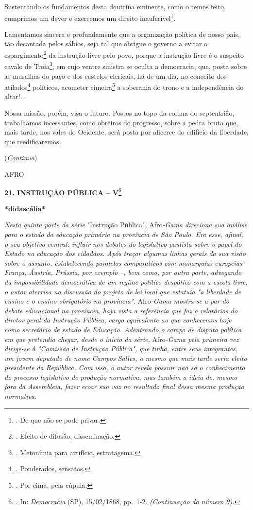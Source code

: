Sustentando os fundamentos desta doutrina eminente, como o temos feito,
cumprimos um dever e exercemos um direito inauferível\footnote{. De que
  não se pode privar.}.

Lamentamos sincera e profundamente que a organização política de nosso
país, tão decantada pelos sábios, seja tal que obrigue o governo a
evitar o espargimento\footnote{. Efeito de difusão, disseminação.} da
instrução livre pelo povo, porque a instrução livre é o suspeito cavalo
de Troia\footnote{. Metonímia para artifício, estratagema.}, em cujo
ventre sinistra se oculta a democracia, que, posta sobre as muralhas do
paço e dos castelos clericais, há de um dia, no conceito dos
atilados\footnote{. Ponderados, sensatos.} políticos, acometer
cimeira\footnote{. Por cima, pela cúpula.} a soberania do trono e a
independência do altar!...

Nossa missão, porém, visa o futuro. Postos no topo da coluna do
septentrião, trabalhamos incessantes, como obreiros do progresso, sobre
a pedra bruta que, mais tarde, nos vales do Ocidente, será posta por
alicerce do edifício da liberdade, que reedificaremos.

(\emph{Continua})

AFRO

\textbf{21. INSTRUÇÃO PÚBLICA -- V}\footnote{. In: \emph{Democracia}
  (SP), 15/02/1868, pp.~1-2. \emph{(Continuação do número 9).}}

\textbf{*didascália*}

\emph{Nesta quinta parte da série} "Instrução Pública"\emph{,}
Afro\emph{-Gama direciona sua análise para o estado da educação primária
na província de São Paulo. Era esse, afinal, o seu objetivo central:
influir nos debates do legislativo paulista sobre o papel do Estado na
educação dos cidadãos. Após traçar algumas linhas gerais da sua visão
sobre o assunto, estabelecendo paralelos comparativos com monarquias
europeias -- França, Áustria, Prússia, por exemplo --, bem como, por
outra parte, advogando da impossibilidade democrática de um regime
político despótico com a escola livre, o autor aterrisa na discussão do
projeto de lei local que estatuía "a liberdade de ensino e o ensino
obrigatório na província".} Afro\emph{-Gama mostra-se a par do debate
educacional na província, haja vista a referência que faz a relatórios
do diretor geral da Instrução Pública, cargo equivalente ao que
conhecemos hoje como secretário de estado de Educação. Adentrando o
campo de disputa política em que pretendia chegar, desde o início da
série,} Afro\emph{-Gama pela primeira vez dirige-se à "Comissão de
Instrução Pública", que tinha, entre seus integrantes, um jovem deputado
de nome Campos Salles, o mesmo que mais tarde seria eleito presidente da
República. Com isso, o autor revela possuir não só o conhecimento do
processo legislativo de produção normativa, mas também a ideia de, mesmo
fora da Assembleia, fazer ecoar sua voz no resultado final dessa mesma
produção normativa.}

